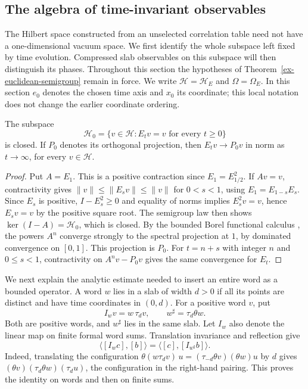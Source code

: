\subsection{The algebra of time-invariant observables}
\label{ex-phases}

The Hilbert space constructed from an unselected correlation table need not
have a one-dimensional vacuum space. We first identify the whole subspace
left fixed by time evolution. Compressed slab observables on this subspace
will then distinguish its phases. Throughout this section the hypotheses
of Theorem~\ref{ex-euclidean-semigroup} remain in force. We write
\(\mathcal H=\mathcal H_E\) and \(\Omega=\Omega_E\). In this section \(e_0\) denotes the chosen time axis and \(x_0\) its coordinate; this local notation does not change the earlier coordinate ordering.

\begin{proposition}\label{ex-ground-projection}
The subspace
\[
 \mathcal H_0=\{v\in\mathcal H:E_tv=v\text{ for every }t\ge0\}
\]
is closed. If \(P_0\) denotes its orthogonal projection, then
\(E_tv\to P_0v\) in norm as \(t\to\infty\), for every \(v\in\mathcal H\).
\end{proposition}
\begin{proof}
Put $A=E_1$. This is a positive contraction since $E_1=E_{1/2}^2$.
If $Av=v$, contractivity gives $\|v\|\le\|E_sv\|\le\|v\|$
for $0<s<1$, using $E_1=E_{1-s}E_s$. Since $E_s$ is positive,
$I-E_s^2\ge0$ and equality of norms implies $E_s^2v=v$, hence
$E_sv=v$ by the positive square root. The semigroup law then shows
$\ker(I-A)=\mathcal H_0$, which is closed.
By the bounded Borel functional calculus
\cite[Theorem~VII.2]{ReedSimonI}, the powers $A^n$ converge strongly
to the spectral projection at $1$, by dominated convergence on
$[0,1]$. This projection is $P_0$. For $t=n+s$ with integer $n$
and $0\le s<1$, contractivity on $A^nv-P_0v$ gives the same
convergence for $E_t$.
\end{proof}

We next explain the analytic estimate needed to insert an entire word as a
bounded operator. A word \(w\) lies in a slab of width \(d>0\) if all its
points are distinct and have time coordinates in \((0,d)\). For a positive
word \(v\), put
\[
 I_wv=w\,\tau_dv,\qquad w^\sharp=\tau_d\theta w.
\]
Both are positive words, and \(w^\sharp\) lies in the same slab. Let
\(I_w\) also denote the linear map on finite formal word sums. Translation
invariance and reflection give
\begin{equation}\label{ex-slab-formal-adjoint}
 \langle[I_wc],[b]\rangle=\langle[c],[I_{w^\sharp}b]\rangle.
\end{equation}
Indeed, translating the configuration
\(\theta(w\tau_dv)\,u=(\tau_{-d}\theta v)(\theta w)u\)
by \(d\) gives \((\theta v)(\tau_d\theta w)(\tau_du)\), the
configuration in the right-hand pairing. This proves the identity on
words and then on finite sums.

